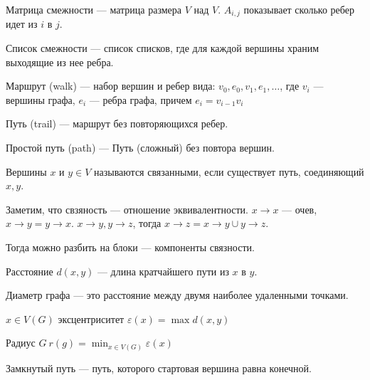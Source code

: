 \begin{definition}
    Матрица смежности --- матрица размера $V$ над $V$. $A_{i, j}$ показывает сколько ребер идет из $i$ в $j$.
\end{definition}
\begin{definition}
    Список смежности --- список списков, где для каждой вершины храним выходящие из нее ребра.
\end{definition}
\begin{definition}
    Маршрут (walk) --- набор вершин и ребер вида: $v_0, e_0, v_1, e_1, \ldots$, где $v_i$ --- вершины графа, $e_i$ --- ребра графа, причем $e_i = v_{i-1}v_i$
\end{definition}
\begin{definition}
    Путь (trail) --- маршрут без повторяющихся ребер.
\end{definition}
\begin{definition}
    Простой путь (path) --- Путь (сложный) без повтора вершин.
\end{definition}
\begin{definition}
    Вершины $x$ и  $y \in V$ называются связанными, если существует путь, соединяющий $x, y$. 
\end{definition}
\begin{remark}
    Заметим, что свзяность --- отношение эквивалентности. $x \to x$ --- очев, $x\to y = y \to x$. $x\to y, y\to z$, тогда $x\to z = x\to y \cup y\to z$.

    Тогда можно разбить на блоки --- компоненты связности.
\end{remark}
\begin{definition}
    Расстояние $d(x, y)$ --- длина кратчайшего пути из  $x$ в  $y$.
\end{definition}
\begin{definition}
    Диаметр графа --- это расстояние между двумя наиболее удаленными точками.
\end{definition}
\begin{definition}
    $x \in V(G)$ эксцентриситет  $\varepsilon(x) = \max d(x, y)$
\end{definition}
\begin{definition}
    Радиус $G\ r(g) = \min_{x \in V(G)} \varepsilon(x)$
\end{definition}
\begin{definition}
    Замкнутый путь --- путь, которого стартовая вершина равна конечной.
\end{definition}
